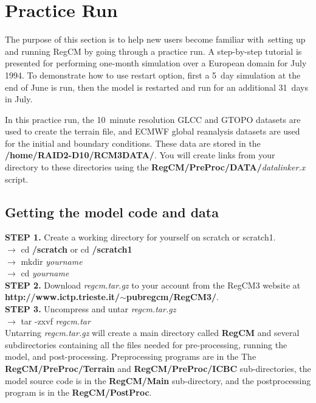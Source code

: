 \section{Practice Run}
The purpose of this section is to help new users become familiar with setting up and running RegCM by going through a practice run.  A step-by-step tutorial is presented for performing one-month simulation over a European domain for July 1994.  To demonstrate how to use restart option, first a 5~day simulation at the end of June is run, then the model is restarted and run for an additional 31~days in July.

In this practice run, the 10~minute resolution GLCC and GTOPO datasets are used to create the terrain file, and ECMWF global reanalysis datasets are used for the initial and boundary conditions. These data are stored in the {\bf /home/RAID2-D10/RCM3DATA/}.  You will create links from your directory to these directories using the {\bf RegCM/PreProc/DATA/}{\it datalinker.x} script. 


\subsection{Getting the model code and data}

\indent
{\bf STEP 1.}  Create a working directory for yourself on scratch or scratch1. \\

\indent 
$\rightarrow$ cd {\bf /scratch} or cd {\bf /scratch1} \\
\indent
$\rightarrow$ mkdir {\it yourname} \\
\indent
$\rightarrow$ cd {\it yourname} \\

\noindent
{\bf STEP 2.}  Download {\it regcm.tar.gz} to your account from the RegCM3 website at \\
{\bf http://www.ictp.trieste.it/$\sim$pubregcm/RegCM3/}. \\

\noindent
{\bf STEP 3.}  Uncompress and untar {\it regcm.tar.gz} \\

\indent
$\rightarrow$ tar -zxvf {\it regcm.tar} \\

\noindent
Untarring {\it regcm.tar.gz} will create a main directory called {\bf RegCM} and 
several subdirectories containing all the files needed for pre-processing, running the model, 
and post-processing.  Preprocessing programs are in the The {\bf RegCM/PreProc/Terrain} and
{\bf RegCM/PreProc/ICBC} sub-directories, the model source code is in the {\bf RegCM/Main} 
sub-directory, and the postprocessing program is in the  {\bf RegCM/PostProc}.


